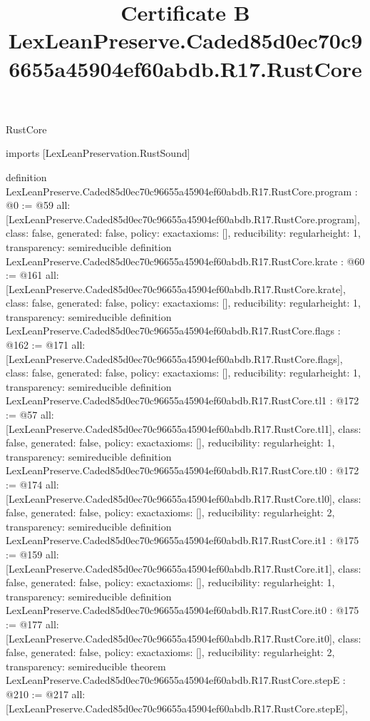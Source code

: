 \begin{lexlean}{RustCore}
\title{Certificate B LexLeanPreserve.Caded85d0ec70c96655a45904ef60abdb.R17.RustCore}
\begin{coremodule}
imports [LexLeanPreservation.RustSound]

definition LexLeanPreserve.Caded85d0ec70c96655a45904ef60abdb.R17.RustCore.program : @0 := @59 {
  all: [LexLeanPreserve.Caded85d0ec70c96655a45904ef60abdb.R17.RustCore.program],
  class: false,
  generated: false,
  policy: exact{axioms: []},
  reducibility: regular{height: 1},
  transparency: semireducible
}
definition LexLeanPreserve.Caded85d0ec70c96655a45904ef60abdb.R17.RustCore.krate : @60 := @161 {
  all: [LexLeanPreserve.Caded85d0ec70c96655a45904ef60abdb.R17.RustCore.krate],
  class: false,
  generated: false,
  policy: exact{axioms: []},
  reducibility: regular{height: 1},
  transparency: semireducible
}
definition LexLeanPreserve.Caded85d0ec70c96655a45904ef60abdb.R17.RustCore.flags : @162 := @171 {
  all: [LexLeanPreserve.Caded85d0ec70c96655a45904ef60abdb.R17.RustCore.flags],
  class: false,
  generated: false,
  policy: exact{axioms: []},
  reducibility: regular{height: 1},
  transparency: semireducible
}
definition LexLeanPreserve.Caded85d0ec70c96655a45904ef60abdb.R17.RustCore.tl1 : @172 := @57 {
  all: [LexLeanPreserve.Caded85d0ec70c96655a45904ef60abdb.R17.RustCore.tl1],
  class: false,
  generated: false,
  policy: exact{axioms: []},
  reducibility: regular{height: 1},
  transparency: semireducible
}
definition LexLeanPreserve.Caded85d0ec70c96655a45904ef60abdb.R17.RustCore.tl0 : @172 := @174 {
  all: [LexLeanPreserve.Caded85d0ec70c96655a45904ef60abdb.R17.RustCore.tl0],
  class: false,
  generated: false,
  policy: exact{axioms: []},
  reducibility: regular{height: 2},
  transparency: semireducible
}
definition LexLeanPreserve.Caded85d0ec70c96655a45904ef60abdb.R17.RustCore.it1 : @175 := @159 {
  all: [LexLeanPreserve.Caded85d0ec70c96655a45904ef60abdb.R17.RustCore.it1],
  class: false,
  generated: false,
  policy: exact{axioms: []},
  reducibility: regular{height: 1},
  transparency: semireducible
}
definition LexLeanPreserve.Caded85d0ec70c96655a45904ef60abdb.R17.RustCore.it0 : @175 := @177 {
  all: [LexLeanPreserve.Caded85d0ec70c96655a45904ef60abdb.R17.RustCore.it0],
  class: false,
  generated: false,
  policy: exact{axioms: []},
  reducibility: regular{height: 2},
  transparency: semireducible
}
theorem LexLeanPreserve.Caded85d0ec70c96655a45904ef60abdb.R17.RustCore.stepE : @210 := @217 {
  all: [LexLeanPreserve.Caded85d0ec70c96655a45904ef60abdb.R17.RustCore.stepE],
}
\end{coremodule}
\end{lexlean}
